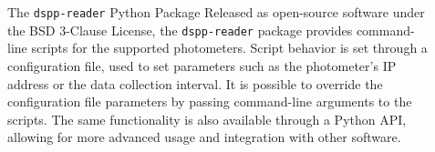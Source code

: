 \documentclass[final]{beamer}
\newlength{\colw}
\newlength{\gutter}
\begin{document}
\begin{frame}[t]
\begin{columns}[t]
\begin{column}{\colw}


\end{column}

\begin{column}{\gutter}\end{column}

\begin{column}{\colw}

  \begin{block}{The \texttt{dspp-reader} Python Package}
    Released as open-source software under the BSD 3-Clause License, the \texttt{dspp-reader} 
    package provides command-line scripts for the supported photometers. 
    Script behavior is set through a configuration file, used to set parameters such as the photometer's IP address or
    the data collection interval. 
    It is possible to override the configuration file parameters by passing command-line arguments to the scripts.
    The same functionality is also available through a Python API, allowing for more advanced usage and integration with other software.

\end{block}


\end{column}
\end{columns}
\end{frame}
\end{document}
